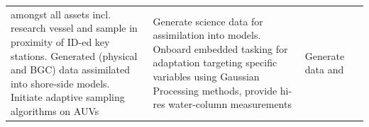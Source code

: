 \begin{table}[!t]
{\begin{tabular}{|p{3cm}|p{4cm}|p{4cm}|p{4cm}|}
                                                        amongst all
                                                        assets incl.
                                                        research vessel
                                                        and sample in
                                                        proximity of
                                                        ID-ed key
                                                        stations.
                                                        Generated
                                                        (physical and
                                                        BGC) data
                                                        assimilated into
                                                        shore-side
                                                        models. Initiate
                                  adaptive sampling algorithms on
                                                        AUVs&Generate
                                                              science
                                                              data for
                                                              assimilation
                                                              into
                                                              models.
                                                              Onboard
                                                              embedded
                                                              tasking
                                                              for
                                                              adaptation
                                                              targeting
                                                              specific
                                                              variables
                                                              using
                                                              Gaussian
                                                              Processing
                                                              methods\cite{fossum19,fossum21},
                                                     provide hi-res
                                                              water-column
                                                     measurements&Generate
                                                                   data
                                                                   and

\end{tabular}}
\end{table}

